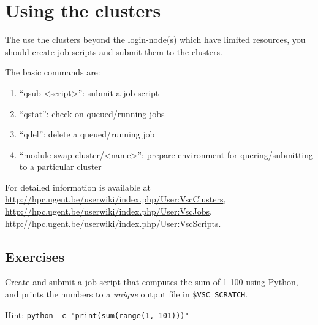 \chapter{Using the clusters}

The use the clusters beyond the \gls{login-node}(s) which have limited resources, you
should create job scripts and submit them to the clusters.

The basic commands are:

\begin{enumerate}
 \item``qsub <script>'': submit a job script
 \item``qstat'': check on queued/running jobs
 \item``qdel'': delete a queued/running job
 \item``module swap cluster/<name>'': prepare environment for quering/submitting to a particular cluster
\end{enumerate}

For detailed information is available at
\url{http://hpc.ugent.be/userwiki/index.php/User:VscClusters},
\url{http://hpc.ugent.be/userwiki/index.php/User:VscJobs},
\url{http://hpc.ugent.be/userwiki/index.php/User:VscScripts}.

\section{Exercises}

Create and submit a job script that computes the sum of 1-100 using Python, and
prints the numbers to a \emph{unique} output file in \lstinline|$VSC_SCRATCH|.

Hint: \lstinline|python -c "print(sum(range(1, 101)))"|

